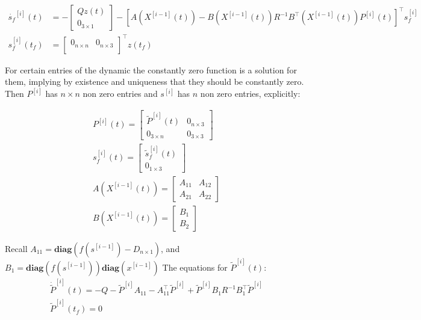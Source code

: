 \documentclass[3p,times]{elsarticle}
\newcommand{\diag}{\textbf{diag}}
\begin{document}
\begin{align}
\dot{s_f}^{[i]}(t) &= -\begin{bmatrix}Qz(t) \\ 0_{3\times 1} \end{bmatrix}- \left[A\left(X^{[i-1]}(t)\right) -B\left(X^{[i-1]}(t)\right)R^{-1}B^\top \left(X^{[i-1]}(t)\right)P^{[i]}(t) \right]^\top s_f^{[i]} \\
s_f^{[i]}(t_f) &=   \begin{bmatrix}
0_{n\times n}  & 0_{n\times 3} \\
\end{bmatrix}^\top z(t_f)
\end{align}

For certain entries of the dynamic the constantly zero function is a solution for them, implying by existence and uniqueness that they should be constantly zero. Then $P^{[i]}$ has $n\times n$ non zero entries and $s^{[i]}$ has $n$ non zero entries, explicitly:

\begin{align}
P^{[i]}(t) = \begin{bmatrix}
\tilde{P}^{[i]}(t) & 0_{n\times 3} \\ 0_{3 \times n} & 0_{3 \times 3}
\end{bmatrix} \\
s_f^{[i]}(t) = \begin{bmatrix}
\tilde{s}_f^{[i]}(t) \\ 0_{1\times 3}
\end{bmatrix} \\
A\left (X^{[i-1]}(t)\right) = \begin{bmatrix}
A_{11} & A_{12} \\ A_{21} & A_{22}
\end{bmatrix} \\
B\left (X^{[i-1]}(t)\right) = \begin{bmatrix}
B_1 \\ B_2
\end{bmatrix} 
\end{align}


Recall $A_{11} = \diag \left( f\left(s^{[i-1]}\right)- D_{n\times 1} \right)$, and $B_1 = \diag\left(f\left(s^{[i-1]}\right)\right)\diag \left(x^{[i-1]} \right) $ The equations for $\tilde{P}^{[i]}(t)$:
\begin{align}
\dot{\tilde{P}}^{[i]}(t)= -Q- \tilde{P}^{[i]}A_{11} -A_{11}^\top \tilde{P}^{[i]} +  \tilde{P}^{[i]}B_1R^{-1}B_1^\top \tilde{P}^{[i]} \\
\tilde{P}^{[i]}(t_f) = 0
\end{align}
\end{document}
